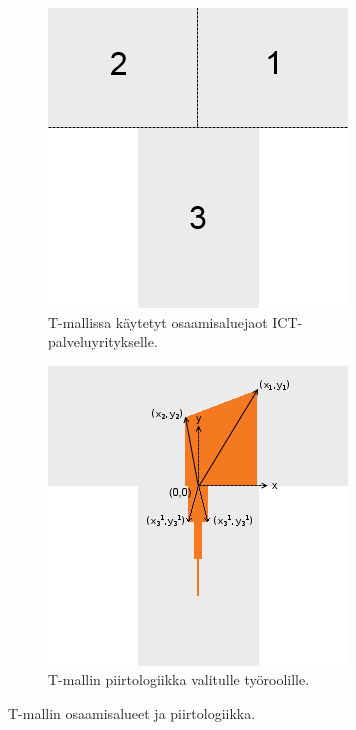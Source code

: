 \documentclass[a4paper,finnish,12pt]{article}
\begin{document}
\begin{figure}[!hb]
	\centering
	\begin{subfigure}[t]{0.45\textwidth}
		\includegraphics[width=\textwidth]{T_areas.png}
		\caption{T-mallissa käytetyt osaamisaluejaot ICT-palveluyritykselle.}
		\label{fig:Tareas}
	\end{subfigure}
	\hfill
	\begin{subfigure}[t]{0.45\textwidth}
		\includegraphics[width=\textwidth]{T_drawing_logics.png}
		\caption{T-mallin piirtologiikka valitulle työroolille.}
		\label{fig:Tlogics}
	\end{subfigure}
	\caption{T-mallin osaamisalueet ja piirtologiikka.}
\end{figure}
\end{document}
